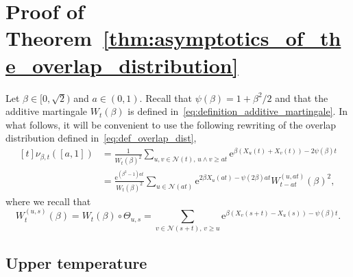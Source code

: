 \documentclass[AHL,Unicode,longabstracts,published]{cedram}
\newcommand{\e}{\mathrm{e}}
\newcommand\1{\mathds{1}}
\newcommand{\cN}{\mathcal{N}}
\begin{document}
\section{Proof of Theorem~\ref{thm:asymptotics_of_the_overlap_distribution}}\label{sec:typical}

Let $\beta \in [0, \sqrt{2})$ and $a \in (0, 1)$. Recall that $\psi(\beta) = 1 + \beta^2/2$ and that the additive martingale $W_t(\beta)$ is defined in~\eqref{eq:definition_additive_martingale}. In what follows, it will be convenient to use the following rewriting of the overlap distribution defined in~\eqref{eq:def_overlap_dist},
\begin{equation}\label{eq:overlap_rewriting}
\begin{aligned}[t]
\nu_{\beta, t}([a, 1]) &= \frac{1}{W_t(\beta)^2} \sum_{u, v \in \cN(t),\, u \wedge v \geq at} \e^{\beta(X_u(t) + X_v(t)) - 2 \psi(\beta) t} \\
&= \frac{\e^{(\beta^2 - 1) at}}{W_t(\beta)^2} \sum_{u \in \cN(at)} \e^{2\beta X_u(at) - \psi(2\beta)at} W_{t - at}^{(u, at)}(\beta)^2,
\end{aligned}
\end{equation}
where we recall that
\begin{equation}\label{eq:definition_shifted_martingale}
W_t^{(u, s)}(\beta) = W_t(\beta) \circ \Theta_{u, s} = \sum_{v \in \cN(s+t),\, v \geq u} \e^{\beta (X_v(s + t) - X_u(s)) - \psi(\beta)t}.
\end{equation}

\subsection{Upper temperature}\label{sct:first_regime}
\end{document}
